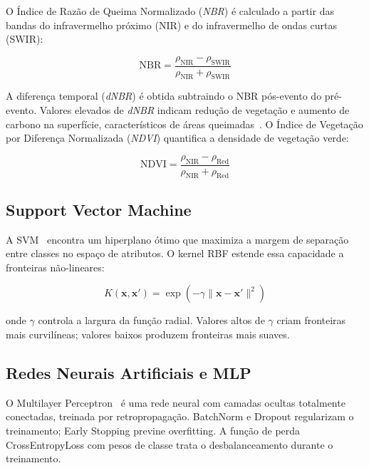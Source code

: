 \documentclass[conference]{IEEEtran}
\begin{document}
O Índice de Razão de Queima Normalizado (\textit{NBR}) é calculado a partir
das bandas do infravermelho próximo (NIR) e do infravermelho de ondas
curtas (SWIR):

\begin{equation}
  \mathrm{NBR} = \frac{\rho_{\mathrm{NIR}} - \rho_{\mathrm{SWIR}}}
                      {\rho_{\mathrm{NIR}} + \rho_{\mathrm{SWIR}}}
  \label{eq:nbr}
\end{equation}

A diferença temporal (\textit{dNBR}) é obtida subtraindo o NBR pós-evento
do pré-evento. Valores elevados de \textit{dNBR} indicam redução de
vegetação e aumento de carbono na superfície, característicos de áreas
queimadas~\cite{b2}. O Índice de Vegetação por Diferença Normalizada
(\textit{NDVI}) quantifica a densidade de vegetação verde:

\begin{equation}
  \mathrm{NDVI} = \frac{\rho_{\mathrm{NIR}} - \rho_{\mathrm{Red}}}
                       {\rho_{\mathrm{NIR}} + \rho_{\mathrm{Red}}}
  \label{eq:ndvi}
\end{equation}

\subsection{Support Vector Machine}

A SVM~\cite{b7} encontra um hiperplano ótimo que maximiza a margem de
separação entre classes no espaço de atributos. O kernel RBF estende essa
capacidade a fronteiras não-lineares:

\begin{equation}
  K(\mathbf{x}, \mathbf{x}') =
  \exp\!\left(-\gamma \|\mathbf{x} - \mathbf{x}'\|^2\right)
  \label{eq:rbf}
\end{equation}

onde $\gamma$ controla a largura da função radial. Valores altos de
$\gamma$ criam fronteiras mais curvilíneas; valores baixos produzem
fronteiras mais suaves.

\subsection{Redes Neurais Artificiais e MLP}

O Multilayer Perceptron~\cite{b11} é uma rede neural com camadas ocultas
totalmente conectadas, treinada por retropropagação. BatchNorm e Dropout
regularizam o treinamento; Early Stopping previne overfitting. A função de
perda CrossEntropyLoss com pesos de classe trata o desbalanceamento durante
o treinamento.
\end{document}

